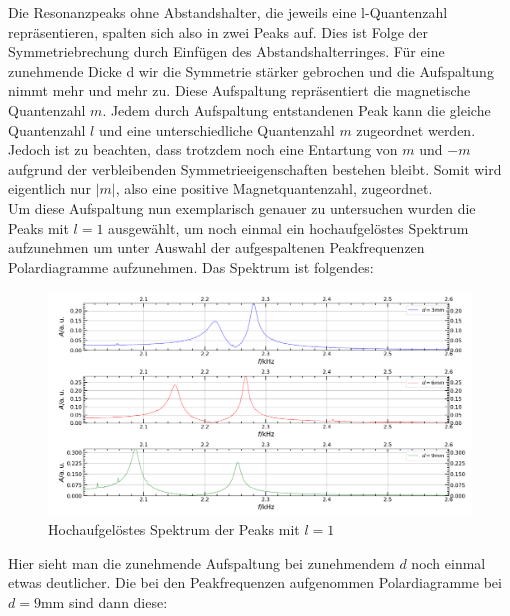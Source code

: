 \documentclass[german,  %
parskip=full,  %
]{scrartcl}
\begin{document}
Die Resonanzpeaks ohne Abstandshalter, die jeweils eine l-Quantenzahl repräsentieren, spalten sich also in zwei Peaks auf. Dies ist Folge der Symmetriebrechung durch Einfügen des Abstandshalterringes. Für eine zunehmende Dicke d wir die Symmetrie stärker gebrochen und die Aufspaltung nimmt mehr und mehr zu. Diese Aufspaltung repräsentiert die magnetische Quantenzahl $m$. Jedem durch Aufspaltung entstandenen Peak kann die gleiche Quantenzahl $l$ und eine unterschiedliche Quantenzahl $m$ zugeordnet werden. Jedoch ist zu beachten, dass trotzdem noch eine Entartung von $m$ und $-m$ aufgrund der verbleibenden Symmetrieeigenschaften bestehen bleibt. Somit wird eigentlich nur $|m|$, also eine positive Magnetquantenzahl, zugeordnet.
\\
Um diese Aufspaltung nun exemplarisch genauer zu untersuchen wurden die Peaks mit $l=1$ ausgewählt, um noch einmal ein hochaufgelöstes Spektrum aufzunehmen um unter Auswahl der aufgespaltenen Peakfrequenzen Polardiagramme aufzunehmen. Das Spektrum ist folgendes: 
\newpage
\begin{figure}[h!]
\centering
\includegraphics[width=\textwidth]{444.png}
\caption{Hochaufgelöstes Spektrum der Peaks mit $l=1$}
\end{figure}
Hier sieht man die zunehmende Aufspaltung bei zunehmendem $d$ noch einmal etwas deutlicher.
\newline Die bei den Peakfrequenzen aufgenommen Polardiagramme bei $d=9$mm sind dann diese:
\\\\
\end{document}
